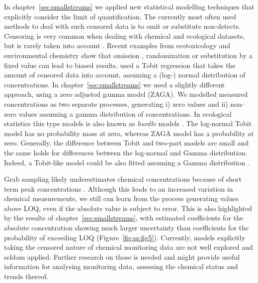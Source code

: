 In chapter~\ref{sec:smallstreams} we applied new statistical modelling techniques that explicitly consider the limit of quantification.
The currently most often used methods to deal with such censored data is to omit or substitute non-detects. 
Censoring is very common when dealing with chemical and ecological datasets, but is rarely taken into account \citep{fox_ecological_2015}. 
Recent examples from ecotoxicology and environmental chemistry show that omission \citep{hansen_re-evaluation_2015}, randomization \citep{goulson_neonicotinoids_2015} or substitution by a fixed value \citep{helsel_much_2010, helsel_fabricating_2006} can lead to biased results.
\citet{hansen_re-evaluation_2015} used a Tobit regression \citep{tobin_estimation_1958} that takes the amount of censored data into account, assuming a (log-) normal distribution of concentrations.
In chapter~\ref{sec:smallstreams} we used a slightly different approach, using a zero adjusted gamma model (ZAGA).
We modelled measured concentrations as two separate processes, generating i) zero values and ii) non-zero values assuming a gamma distribution of concentrations.
In ecological statistics this type models is also known as \emph{hurdle} models \citep{martin_zero_2005}. 
The log-normal Tobit model has no probability mass at zero, whereas ZAGA model has a probability at zero. 
Generally, the difference between Tobit and two-part models are small \citep{min_modeling_2002} and the same holds for differences between the log-normal and Gamma distribution. 
Indeed, a Tobit-like model could be also fitted assuming a Gamma distribution \citep{sigrist_using_2010}.

Grab sampling likely underestimates chemical concentrations because of short term peak concentrations \citep{xing_influences_2013, stehle_probabilistic_2013}.
Although this leads to an increased variation in chemical measurements, we still can learn from the process generating values above LOQ, even if the absolute value is subject to error. 
This is also highlighted by the results of chapter~\ref{sec:smallstreams}, with estimated coefficients for the absolute concentration showing much larger uncertainty than coefficients for the probability of exceeding LOQ (Figure~\ref{fig:ss:fig5}). 
Currently, models explicitly taking the censored nature of chemical monitoring data are not well explored and seldom applied.
Further research on those is needed and might provide useful information for analysing monitoring data, assessing the chemical status and trends thereof.




